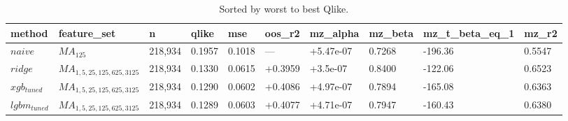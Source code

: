 \documentclass{article}
\begin{document}
% 
\begin{table}[t]
\centering
\caption{Sorted by worst to best Qlike.}
\label{tab:master_compact}
\begin{tabular}{llllllllll}
\toprule
method & feature\_set & n & qlike & mse & oos\_r2 & mz\_alpha & mz\_beta & mz\_t\_beta\_eq\_1 & mz\_r2 \\
\midrule
$naive$ & $MA_{125}$ & 218,934 & 0.1957 & 0.1018 & — & +5.47e-07 & 0.7268 & -196.36 & 0.5547 \\
$ridge$ & $MA_{1,5,25,125,625,3125}$ & 218,934 & 0.1330 & 0.0615 & +0.3959 & +3.5e-07 & 0.8400 & -122.06 & 0.6523 \\
$xgb_{tuned}$ & $MA_{1,5,25,125,625,3125}$ & 218,934 & 0.1290 & 0.0602 & +0.4086 & +4.97e-07 & 0.7894 & -165.08 & 0.6363 \\
$lgbm_{tuned}$ & $MA_{1,5,25,125,625,3125}$ & 218,934 & 0.1289 & 0.0603 & +0.4077 & +4.71e-07 & 0.7947 & -160.43 & 0.6380 \\
\bottomrule
\end{tabular}
\end{table}
\end{document}
